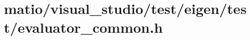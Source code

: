 \hypertarget{matio_2visual__studio_2test_2eigen_2test_2evaluator__common_8h_source}{}\section{matio/visual\+\_\+studio/test/eigen/test/evaluator\+\_\+common.h}
\label{matio_2visual__studio_2test_2eigen_2test_2evaluator__common_8h_source}

\begin{DoxyCode}
\end{DoxyCode}
